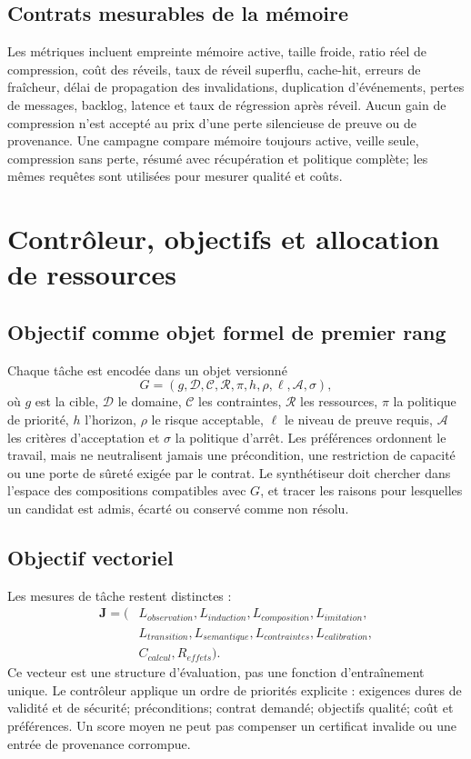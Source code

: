\documentclass[11pt,a4paper]{article}
\begin{document}
\subsection{Contrats mesurables de la mémoire}
Les métriques incluent empreinte mémoire active, taille froide, ratio réel de compression, coût des réveils, taux de réveil superflu, cache-hit, erreurs de fraîcheur, délai de propagation des invalidations, duplication d'événements, pertes de messages, backlog, latence et taux de régression après réveil. Aucun gain de compression n'est accepté au prix d'une perte silencieuse de preuve ou de provenance. Une campagne compare mémoire toujours active, veille seule, compression sans perte, résumé avec récupération et politique complète; les mêmes requêtes sont utilisées pour mesurer qualité et coûts.

\section{Contrôleur, objectifs et allocation de ressources}
\subsection{Objectif comme objet formel de premier rang}
Chaque tâche est encodée dans un objet versionné
\[
G=(g,\mathcal{D},\mathcal{C},\mathcal{R},\pi,h,\rho,\ell,\mathcal{A},\sigma),
\]
où \(g\) est la cible, \(\mathcal{D}\) le domaine, \(\mathcal{C}\) les contraintes, \(\mathcal{R}\) les ressources, \(\pi\) la politique de priorité, \(h\) l'horizon, \(\rho\) le risque acceptable, \(\ell\) le niveau de preuve requis, \(\mathcal{A}\) les critères d'acceptation et \(\sigma\) la politique d'arrêt. Les préférences ordonnent le travail, mais ne neutralisent jamais une précondition, une restriction de capacité ou une porte de sûreté exigée par le contrat. Le synthétiseur doit chercher dans l'espace des compositions compatibles avec \(G\), et tracer les raisons pour lesquelles un candidat est admis, écarté ou conservé comme non résolu.

\subsection{Objectif vectoriel}
Les mesures de tâche restent distinctes :
\[
\begin{aligned}
\mathbf{J}=(&L_{observation},L_{induction},L_{composition},L_{imitation},\\
           &L_{transition},L_{semantique},L_{contraintes},L_{calibration},\\
           &C_{calcul},R_{effets}).
\end{aligned}
\]
Ce vecteur est une structure d'évaluation, pas une fonction d'entraînement unique. Le contrôleur applique un ordre de priorités explicite : exigences dures de validité et de sécurité; préconditions; contrat demandé; objectifs qualité; coût et préférences. Un score moyen ne peut pas compenser un certificat invalide ou une entrée de provenance corrompue.
\end{document}
